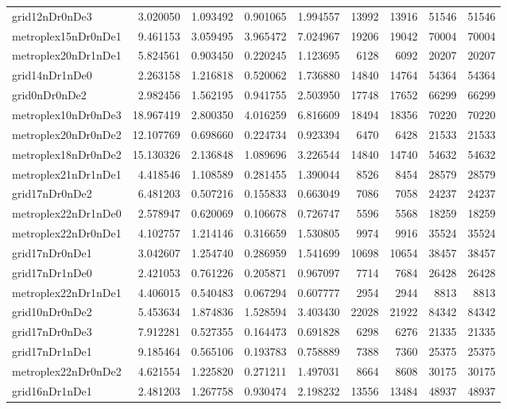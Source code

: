 \begin{longtable}{|l|r|r|r|r|r|r|r|r|}
grid12nDr0nDe3 & 3.020050 & 1.093492 & 0.901065 & 1.994557 & 13992 & 13916 & 51546 & 51546 \\
metroplex15nDr0nDe1 & 9.461153 & 3.059495 & 3.965472 & 7.024967 & 19206 & 19042 & 70004 & 70004 \\
metroplex20nDr1nDe1 & 5.824561 & 0.903450 & 0.220245 & 1.123695 & 6128 & 6092 & 20207 & 20207 \\
grid14nDr1nDe0 & 2.263158 & 1.216818 & 0.520062 & 1.736880 & 14840 & 14764 & 54364 & 54364 \\
grid0nDr0nDe2 & 2.982456 & 1.562195 & 0.941755 & 2.503950 & 17748 & 17652 & 66299 & 66299 \\
metroplex10nDr0nDe3 & 18.967419 & 2.800350 & 4.016259 & 6.816609 & 18494 & 18356 & 70220 & 70220 \\
metroplex20nDr0nDe2 & 12.107769 & 0.698660 & 0.224734 & 0.923394 & 6470 & 6428 & 21533 & 21533 \\
metroplex18nDr0nDe2 & 15.130326 & 2.136848 & 1.089696 & 3.226544 & 14840 & 14740 & 54632 & 54632 \\
metroplex21nDr1nDe1 & 4.418546 & 1.108589 & 0.281455 & 1.390044 & 8526 & 8454 & 28579 & 28579 \\
grid17nDr0nDe2 & 6.481203 & 0.507216 & 0.155833 & 0.663049 & 7086 & 7058 & 24237 & 24237 \\
metroplex22nDr1nDe0 & 2.578947 & 0.620069 & 0.106678 & 0.726747 & 5596 & 5568 & 18259 & 18259 \\
metroplex22nDr0nDe1 & 4.102757 & 1.214146 & 0.316659 & 1.530805 & 9974 & 9916 & 35524 & 35524 \\
grid17nDr0nDe1 & 3.042607 & 1.254740 & 0.286959 & 1.541699 & 10698 & 10654 & 38457 & 38457 \\
grid17nDr1nDe0 & 2.421053 & 0.761226 & 0.205871 & 0.967097 & 7714 & 7684 & 26428 & 26428 \\
metroplex22nDr1nDe1 & 4.406015 & 0.540483 & 0.067294 & 0.607777 & 2954 & 2944 & 8813 & 8813 \\
grid10nDr0nDe2 & 5.453634 & 1.874836 & 1.528594 & 3.403430 & 22028 & 21922 & 84342 & 84342 \\
grid17nDr0nDe3 & 7.912281 & 0.527355 & 0.164473 & 0.691828 & 6298 & 6276 & 21335 & 21335 \\
grid17nDr1nDe1 & 9.185464 & 0.565106 & 0.193783 & 0.758889 & 7388 & 7360 & 25375 & 25375 \\
metroplex22nDr0nDe2 & 4.621554 & 1.225820 & 0.271211 & 1.497031 & 8664 & 8608 & 30175 & 30175 \\
grid16nDr1nDe1 & 2.481203 & 1.267758 & 0.930474 & 2.198232 & 13556 & 13484 & 48937 & 48937 \\

\end{longtable}
